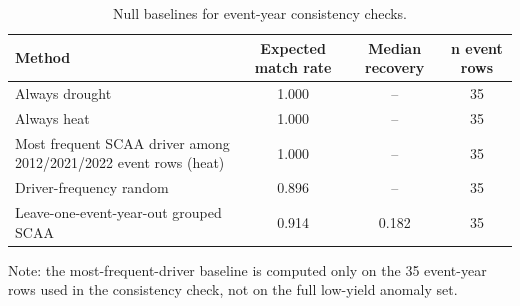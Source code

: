 \begin{table}[!htbp]
\centering
\caption{Null baselines for event-year consistency checks.}
\label{tab:event_null_baselines}
\small
\renewcommand{\arraystretch}{1.12}
\begin{tabular*}{\linewidth}{@{\extracolsep{\fill}}lccc@{}}
\toprule
Method & Expected match rate & Median recovery & n event rows \\
\midrule
Always drought & 1.000 & -- & 35 \\
Always heat & 1.000 & -- & 35 \\
Most frequent SCAA driver among 2012/2021/2022 event rows (heat) & 1.000 & -- & 35 \\
Driver-frequency random & 0.896 & -- & 35 \\
Leave-one-event-year-out grouped SCAA & 0.914 & 0.182 & 35 \\
\bottomrule
\end{tabular*}
\vspace{0.25em}
\begin{minipage}{\linewidth}
\footnotesize Note: the most-frequent-driver baseline is computed only on the 35 event-year rows used in the consistency check, not on the full low-yield anomaly set.
\end{minipage}
\end{table}

